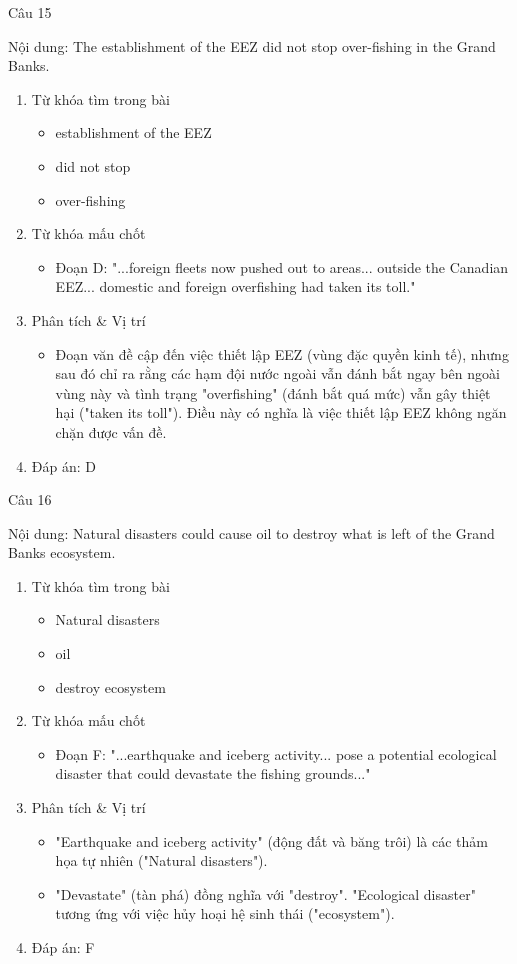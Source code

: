 \documentclass{../templateReading/cdreading}
\begin{document}
Câu 15

Nội dung: The establishment of the EEZ did not stop over-fishing in the Grand Banks.
\begin{enumerate}
\item Từ khóa tìm trong bài
\begin{itemize}
\item establishment of the EEZ
\item did not stop
\item over-fishing
\end{itemize}
\item Từ khóa mấu chốt
\begin{itemize}
\item Đoạn D: "...foreign fleets now pushed out to areas... outside the Canadian EEZ... domestic and foreign overfishing had taken its toll."
\end{itemize}
\item Phân tích \& Vị trí
\begin{itemize}
\item Đoạn văn đề cập đến việc thiết lập EEZ (vùng đặc quyền kinh tế), nhưng sau đó chỉ ra rằng các hạm đội nước ngoài vẫn đánh bắt ngay bên ngoài vùng này và tình trạng "overfishing" (đánh bắt quá mức) vẫn gây thiệt hại ("taken its toll"). Điều này có nghĩa là việc thiết lập EEZ không ngăn chặn được vấn đề.
\end{itemize}
\item Đáp án: D
\end{enumerate}

Câu 16

Nội dung: Natural disasters could cause oil to destroy what is left of the Grand Banks ecosystem.
\begin{enumerate}
\item Từ khóa tìm trong bài
\begin{itemize}
\item Natural disasters
\item oil
\item destroy ecosystem
\end{itemize}
\item Từ khóa mấu chốt
\begin{itemize}
\item Đoạn F: "...earthquake and iceberg activity... pose a potential ecological disaster that could devastate the fishing grounds..."
\end{itemize}
\item Phân tích \& Vị trí
\begin{itemize}
\item "Earthquake and iceberg activity" (động đất và băng trôi) là các thảm họa tự nhiên ("Natural disasters").
\item "Devastate" (tàn phá) đồng nghĩa với "destroy". "Ecological disaster" tương ứng với việc hủy hoại hệ sinh thái ("ecosystem").
\end{itemize}
\item Đáp án: F
\end{enumerate}
\end{document}
